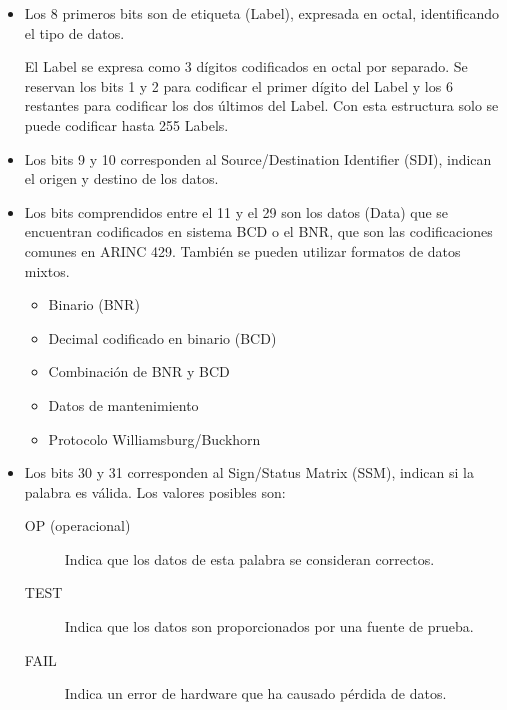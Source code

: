   \begin{itemize}
  \item Los 8 primeros bits son de etiqueta (Label), expresada en octal, identificando el tipo de datos.

El Label  se  expresa  como  3  dígitos codificados en octal por separado.
Se reservan los bits 1 y 2 para codificar el primer dígito del Label 
y los 6 restantes para codificar los dos últimos del Label.
Con esta estructura solo se puede codificar hasta 255 Labels.


  \item Los bits 9 y 10 corresponden al Source/Destination Identifier
    (SDI),  indican el origen y destino de los datos.
  \item Los bits comprendidos entre el 11 y el 29 son los datos
    (Data) que se encuentran codificados en sistema BCD o el BNR, que son las codificaciones comunes en ARINC 429. También se pueden utilizar formatos de datos mixtos.
    \begin{itemize}
    \item Binario (BNR)
    \item Decimal codificado en binario (BCD)
    \item Combinación de BNR y BCD
    \item Datos de mantenimiento
    \item Protocolo Williamsburg/Buckhorn
    \end{itemize}

  \item Los bits 30 y 31 corresponden al Sign/Status Matrix (SSM), indican si la palabra es válida. Los valores posibles son:
    \begin{description}
    \item[OP (operacional)] Indica que los datos de esta palabra se consideran correctos.
    \item[TEST]  Indica que los datos son proporcionados por una fuente de prueba.
    \item[FAIL]  Indica un error de hardware que ha causado pérdida de datos.


\end{description}
\end{itemize}
